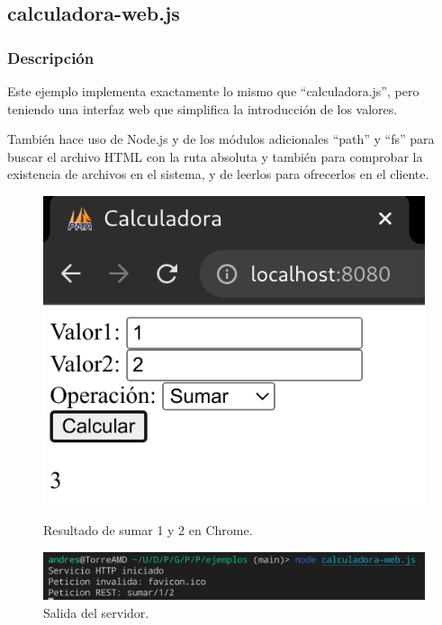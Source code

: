 \documentclass{article}
\begin{document}
\newpage

\subsection{calculadora-web.js}
\subsubsection{Descripción}
Este ejemplo implementa exactamente lo mismo que ``calculadora.js'', pero teniendo una interfaz web que simplifica la introducción de los valores.

También hace uso de Node.js y de los módulos adicionales ``path'' y ``fs'' para buscar el archivo HTML con la ruta absoluta y también para comprobar la existencia de archivos en el sistema, y de leerlos para ofrecerlos en el cliente.

\begin{figure}[H]
    \centering
    \begin{minipage}[H]{0.49\textwidth}
        \centering
        \includegraphics[width=\textwidth]{images/cwebsuma.png}
        \caption{Resultado de sumar 1 y 2 en Chrome.}
    \end{minipage}
    \hfill
    \begin{minipage}[H]{0.49\textwidth}
        \centering
        \includegraphics[width=\textwidth]{images/cwebsumaserver.png}
        \caption{Salida del servidor.}
    \end{minipage}
\end{figure}
\end{document}
